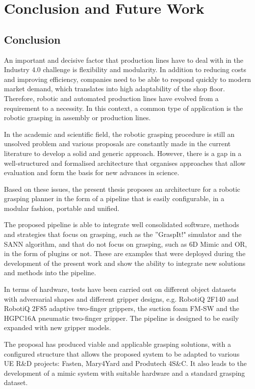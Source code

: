 \chapter{Conclusion and Future Work}
\label{cap6:conclusion}

\section{Conclusion}

An important and decisive factor that production lines have to deal with in the Industry 4.0 challenge is flexibility and modularity. In addition to reducing costs and improving efficiency, companies need to be able to respond quickly to modern market demand, which translates into high adaptability of the shop floor. Therefore, robotic and automated production lines have evolved from a requirement to a necessity. In this context, a common type of application is the robotic grasping in assembly or production lines. 

In the academic and scientific field, the robotic grasping procedure is still an unsolved problem and various proposals are constantly made in the current literature to develop a solid and generic approach. However, there is a gap in a well-structured and formalised architecture that organises approaches that allow evaluation and form the basis for new advances in science.

Based on these issues, the present thesis proposes an architecture for a robotic grasping planner in the form of a pipeline that is easily configurable, in a modular fashion, portable and unified.

The proposed pipeline is able to integrate well consolidated software, methods and strategies that focus on grasping, such as the ''GraspIt!" simulator and the \ac{SANN} algorithm, and that do not focus on grasping, such as 6D Mimic and OR, in the form of plugins or not. These are examples that were deployed during the development of the present work and show the ability to integrate new solutions and methods into the pipeline.

In terms of hardware, tests have been carried out on different object datasets with adversarial shapes and different gripper designs, e.g. RobotiQ 2F140 and RobotiQ 2F85 adaptive two-finger grippers, the suction foam FM-SW and the HGPC16A pneumatic two-finger gripper. The pipeline is designed to be easily expanded with new gripper models.

The proposal has produced viable and applicable grasping solutions, with a configured structure that allows the proposed system to be adapted to various UE R\&D projects: Fasten, Mary4Yard and Produtech 4S\&C. It also leads to the development of a mimic system with suitable hardware and a standard grasping dataset.

